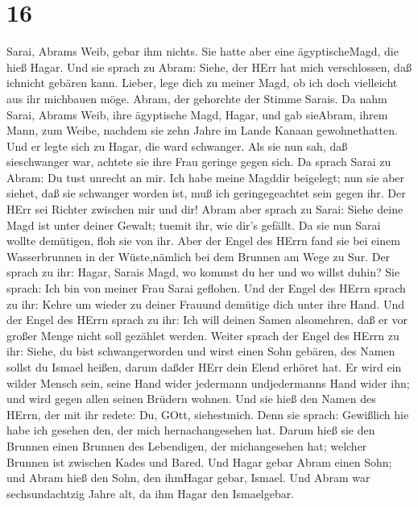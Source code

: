 \hypertarget{section-15}{%
\section{16}\label{section-15}}

 Sarai, Abrams Weib, gebar ihm nichts. Sie hatte aber eine
ägyptischeMagd, die hieß Hagar.  Und sie sprach zu Abram:
Siehe, der HErr hat mich verschlossen, daß ichnicht gebären kann.
Lieber, lege dich zu meiner Magd, ob ich doch vielleicht aus ihr
michbauen möge. Abram, der gehorchte der Stimme Sarais.  Da
nahm Sarai, Abrams Weib, ihre ägyptische Magd, Hagar, und gab sieAbram,
ihrem Mann, zum Weibe, nachdem sie zehn Jahre im Lande Kanaan
gewohnethatten.  Und er legte sich zu Hagar, die ward
schwanger. Als sie nun sah, daß sieschwanger war, achtete sie ihre Frau
geringe gegen sich.  Da sprach Sarai zu Abram: Du tust
unrecht an mir. Ich habe meine Magddir beigelegt; nun sie aber siehet,
daß sie schwanger worden ist, muß ich geringegeachtet sein gegen ihr.
Der HErr sei Richter zwischen mir und dir!  Abram aber
sprach zu Sarai: Siehe deine Magd ist unter deiner Gewalt; tuemit ihr,
wie dir's gefällt. Da sie nun Sarai wollte demütigen, floh sie von ihr.
 Aber der Engel des HErrn fand sie bei einem Wasserbrunnen
in der Wüste,nämlich bei dem Brunnen am Wege zu Sur.  Der
sprach zu ihr: Hagar, Sarais Magd, wo kommst du her und wo willst duhin?
Sie sprach: Ich bin von meiner Frau Sarai geflohen.  Und der
Engel des HErrn sprach zu ihr: Kehre um wieder zu deiner Frauund
demütige dich unter ihre Hand.  Und der Engel des HErrn
sprach zu ihr: Ich will deinen Samen alsomehren, daß er vor großer Menge
nicht soll gezählet werden.  Weiter sprach der Engel des
HErrn zu ihr: Siehe, du bist schwangerworden und wirst einen Sohn
gebären, des Namen sollst du Ismael heißen, darum daßder HErr dein Elend
erhöret hat.  Er wird ein wilder Mensch sein, seine Hand
wider jedermann undjedermanns Hand wider ihn; und wird gegen allen
seinen Brüdern wohnen.  Und sie hieß den Namen des HErrn,
der mit ihr redete: Du, GOtt, siehestmich. Denn sie sprach: Gewißlich
hie habe ich gesehen den, der mich hernachangesehen hat. 
Darum hieß sie den Brunnen einen Brunnen des Lebendigen, der
michangesehen hat; welcher Brunnen ist zwischen Kades und Bared.
 Und Hagar gebar Abram einen Sohn; und Abram hieß den Sohn,
den ihmHagar gebar, Ismael.  Und Abram war sechsundachtzig
Jahre alt, da ihm Hagar den Ismaelgebar.

